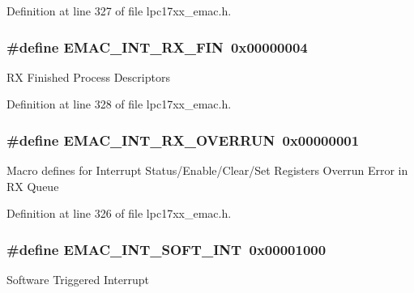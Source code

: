 \-Definition at line 327 of file lpc17xx\-\_\-emac.\-h.

\hypertarget{group___e_m_a_c___private___macros_ga9cb2271dddb8ccc91a3247549d635f05}{
\subsubsection[{\-E\-M\-A\-C\-\_\-\-I\-N\-T\-\_\-\-R\-X\-\_\-\-F\-I\-N}]{\setlength{\rightskip}{0pt plus 5cm}\#define {\bf \-E\-M\-A\-C\-\_\-\-I\-N\-T\-\_\-\-R\-X\-\_\-\-F\-I\-N}~0x00000004}}\label{group___e_m_a_c___private___macros_ga9cb2271dddb8ccc91a3247549d635f05}
\-R\-X \-Finished \-Process \-Descriptors 

\-Definition at line 328 of file lpc17xx\-\_\-emac.\-h.

\hypertarget{group___e_m_a_c___private___macros_gad364b9b6c7ed01106a476c43a79eb191}{
\subsubsection[{\-E\-M\-A\-C\-\_\-\-I\-N\-T\-\_\-\-R\-X\-\_\-\-O\-V\-E\-R\-R\-U\-N}]{\setlength{\rightskip}{0pt plus 5cm}\#define {\bf \-E\-M\-A\-C\-\_\-\-I\-N\-T\-\_\-\-R\-X\-\_\-\-O\-V\-E\-R\-R\-U\-N}~0x00000001}}\label{group___e_m_a_c___private___macros_gad364b9b6c7ed01106a476c43a79eb191}
\-Macro defines for \-Interrupt \-Status/\-Enable/\-Clear/\-Set \-Registers \-Overrun \-Error in \-R\-X \-Queue 

\-Definition at line 326 of file lpc17xx\-\_\-emac.\-h.

\hypertarget{group___e_m_a_c___private___macros_gabc911c7e58f832af31c668661adbf63f}{
\subsubsection[{\-E\-M\-A\-C\-\_\-\-I\-N\-T\-\_\-\-S\-O\-F\-T\-\_\-\-I\-N\-T}]{\setlength{\rightskip}{0pt plus 5cm}\#define {\bf \-E\-M\-A\-C\-\_\-\-I\-N\-T\-\_\-\-S\-O\-F\-T\-\_\-\-I\-N\-T}~0x00001000}}\label{group___e_m_a_c___private___macros_gabc911c7e58f832af31c668661adbf63f}
\-Software \-Triggered \-Interrupt 

